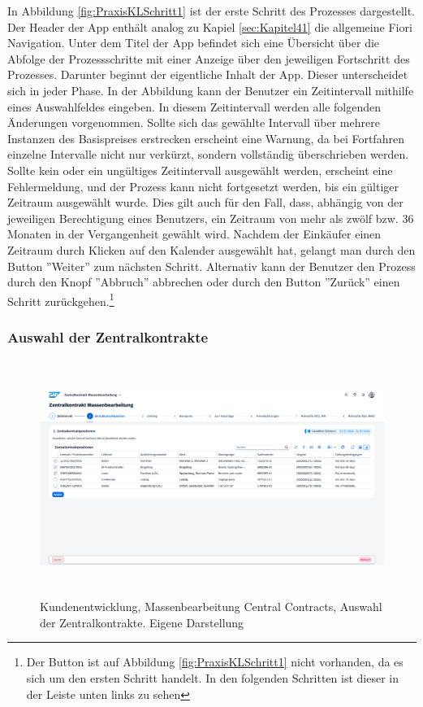 In Abbildung \ref{fig:PraxisKLSchritt1} ist der erste Schritt des Prozesses dargestellt. Der Header der App enthält analog zu  Kapiel \ref{sec:Kapitel41} die allgemeine Fiori Navigation. Unter dem Titel der App befindet sich eine Übersicht über die Abfolge der Prozessschritte mit einer Anzeige über den jeweiligen Fortschritt des Prozesses. Darunter beginnt der eigentliche Inhalt der App. Dieser unterscheidet sich in jeder Phase. In der Abbildung kann der Benutzer ein Zeitintervall mithilfe eines Auswahlfeldes eingeben. In diesem Zeitintervall werden alle folgenden Änderungen vorgenommen. Sollte sich das gewählte Intervall über mehrere Instanzen des Basispreises erstrecken erscheint eine Warnung, da bei Fortfahren einzelne Intervalle nicht nur verkürzt, sondern vollständig überschrieben werden. Sollte kein oder ein ungültiges Zeitintervall ausgewählt werden, erscheint eine Fehlermeldung, und der Prozess kann nicht fortgesetzt werden, bis ein gültiger Zeitraum ausgewählt wurde. Dies gilt auch für den Fall, dass, abhängig von der jeweiligen Berechtigung eines Benutzers, ein Zeitraum von mehr als zwölf bzw. 36 Monaten in der Vergangenheit gewählt wird. Nachdem der Einkäufer einen Zeitraum durch Klicken auf den Kalender ausgewählt hat, gelangt man durch den Button ''Weiter'' zum nächsten Schritt. Alternativ kann der Benutzer den Prozess durch den Knopf ''Abbruch'' abbrechen oder durch den Button ''Zurück'' einen Schritt zurückgehen.\footnote{Der Button ist auf Abbildung \ref{fig:PraxisKLSchritt1} nicht vorhanden, da es sich um den ersten Schritt handelt. In den folgenden Schritten ist dieser in der Leiste unten links zu sehen}

\subsubsection{Auswahl der Zentralkontrakte} \label{sec:Kapitel422}

\begin{figure}[H]
    \centering
    \includegraphics[height=7.66cm]{Bilder/Praxisteil-KL-Schritt-2.png}
    \caption[Kundenentwicklung, Massenbearbeitung Central Contracts, Auswahl der Zentralkontrakte]{Kundenentwicklung, Massenbearbeitung Central Contracts, Auswahl der Zentralkontrakte. Eigene Darstellung}
    \label{fig:PraxisKLSchritt2}
\end{figure}

